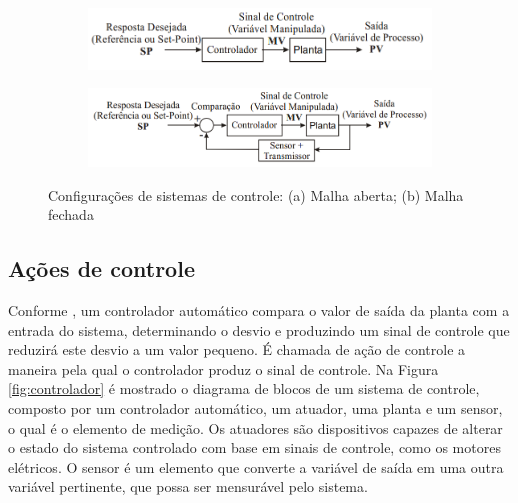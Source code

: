 \begin{figure}[h]
    \centering
    \captionsetup{width=0.8\textwidth,font=footnotesize,textfont=bf}
    \begin{subfigure}[b]{0.8\textwidth}
	\centering
        \includegraphics[width=\textwidth,height=\textheight,keepaspectratio]{figuras/MalhaAberta.png}
        \caption{\centering \label{fig:Malhaaberta}}
    \end{subfigure}
    
    \begin{subfigure}[b]{0.8\textwidth}
	\centering
        \includegraphics[width=\textwidth,height=\textheight,keepaspectratio]{figuras/MalhaFechada.png}
        \caption{\centering \label{fig:Malhafechada}}
    \end{subfigure}
    
    \caption{\label{fig:Malhas} Configurações de sistemas de controle: (a) Malha aberta; (b) Malha fechada \cite{controle}} 
\end{figure}


\subsection{Ações de controle}

Conforme , um controlador automático compara o valor de saída da planta com a entrada do sistema, 
determinando o desvio e produzindo um sinal de controle que reduzirá este desvio a um valor pequeno. É chamada de ação de controle a 
maneira pela qual o controlador produz o sinal de controle. Na Figura \ref{fig:controlador} é mostrado o diagrama de blocos 
de um sistema de controle, composto por um controlador automático, um atuador, uma planta e um sensor, o qual é 
o elemento de medição. Os atuadores são dispositivos capazes de alterar 
o estado do sistema controlado com base em sinais de controle, como os motores elétricos. O sensor é um elemento que 
converte a variável de saída em uma outra variável pertinente, que possa ser mensurável pelo sistema.


